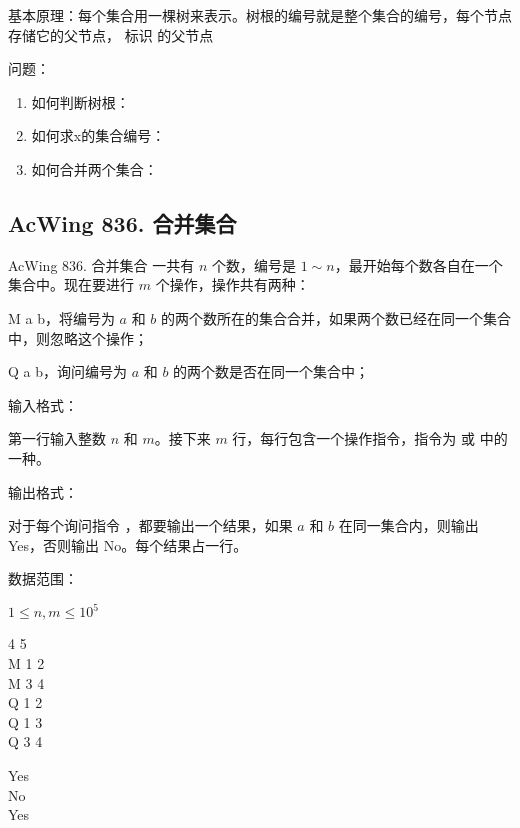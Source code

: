 基本原理：每个集合用一棵树来表示。树根的编号就是整个集合的编号，每个节点存储它的父节点， 标识 的父节点

问题：

\begin{enumerate}
    \item 如何判断树根： 
    \item 如何求x的集合编号： 
    \item 如何合并两个集合： 
\end{enumerate}

\subsection{AcWing 836. 合并集合}

\begin{titledbox}{AcWing 836. 合并集合}
    一共有 $n$ 个数，编号是 $1 \sim n$，最开始每个数各自在一个集合中。现在要进行 $m$ 个操作，操作共有两种：

    M a b，将编号为 $a$ 和 $b$ 的两个数所在的集合合并，如果两个数已经在同一个集合中，则忽略这个操作；

    Q a b，询问编号为 $a$ 和 $b$ 的两个数是否在同一个集合中；

    输入格式：

    第一行输入整数 $n$ 和 $m$。接下来 $m$ 行，每行包含一个操作指令，指令为  或  中的一种。

    输出格式：

    对于每个询问指令 ，都要输出一个结果，如果 $a$ 和 $b$ 在同一集合内，则输出 Yes，否则输出 No。每个结果占一行。

    数据范围：

    $1 \le n,m \le 10^5$

    \begin{inputblock}
        4 5 \\
        M 1 2 \\
        M 3 4 \\
        Q 1 2 \\
        Q 1 3 \\
        Q 3 4
    \end{inputblock}
    \begin{outputblock}
        Yes \\
        No \\
        Yes
    \end{outputblock}
\end{titledbox}

